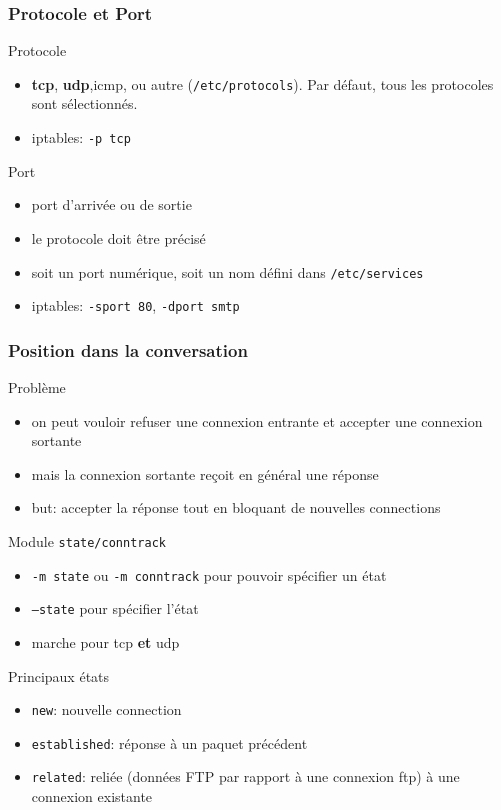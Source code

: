 \begin{reveals}
\begin{frame}
  \frametitle{Protocole et Port}
  \vfill
  \begin{block}{Protocole}
    \begin{itemize}
    \item \textbf{tcp}, \textbf{udp},icmp, ou autre
      (\texttt{/etc/protocols}). Par défaut, tous les protocoles sont
      sélectionnés.
    \item iptables: \texttt{-p tcp}
    \end{itemize}
  \end{block}
  \vfill
  \begin{block}{Port}
    \begin{itemize}
    \item port d'arrivée ou de sortie
    \item le protocole doit être précisé
    \item soit un port numérique, soit un nom défini dans
      \texttt{/etc/services}
    \item iptables: \texttt{-sport 80}, \texttt{-dport smtp}
    \end{itemize}
  \end{block}
  \vfill
\end{frame}

\begin{frame}
  \frametitle{Position dans la conversation}

  \vfill
  \begin{block}{Problème}
    \begin{itemize}
    \item on peut vouloir refuser une connexion entrante et accepter
      une connexion sortante
    \item mais la connexion sortante reçoit en général une réponse
    \item but: accepter la réponse tout en bloquant de nouvelles
      connections
    \end{itemize}
  \end{block}
  \vfill
  \begin{block}{Module \texttt{state/conntrack}}
    \begin{itemize}
    \item \texttt{-m state} ou \texttt{-m conntrack} pour pouvoir
      spécifier un état
    \item \texttt{--state} pour spécifier l'état
    \item marche pour tcp \textbf{et} udp
    \end{itemize}
  \end{block}
  \vfill
  \begin{block}{Principaux états}
    \begin{itemize}
    \item \texttt{new}: nouvelle connection
    \item \texttt{established}: réponse à un paquet précédent
    \item \texttt{related}: reliée (données FTP par rapport à une
      connexion ftp) à une connexion existante
    \end{itemize}
  \end{block}
  \vfill
\end{frame}


\end{reveals}
